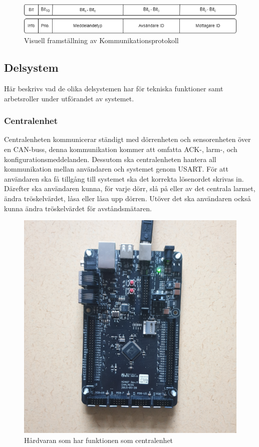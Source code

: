 \documentclass{article}
\begin{document}
\begin{figure}[h]
    \centering
    \includegraphics[scale=0.5]{Projektrapport/protokoll.png}
    \caption {Visuell framställning av Kommunikationsprotokoll}
    \label{fig:drawing}
\end{figure}


\subsection{Delsystem}
Här beskrivs vad de olika delsystemen har för tekniska funktioner samt arbetsroller under utförandet av systemet. 

\subsubsection{Centralenhet}
Centralenheten kommunicerar ständigt med dörrenheten och sensorenheten över en CAN-buss, denna kommunikation kommer att omfatta ACK-, larm-, och konfigurationsmeddelanden. 
Dessutom ska centralenheten hantera all kommunikation mellan användaren och systemet genom USART. För att användaren ska få tillgång till systemet ska det korrekta lösenordet skrivas in. 
Därefter ska användaren kunna, för varje dörr, slå på eller av det centrala larmet, ändra tröskelvärdet, låsa eller låsa upp dörren. 
Utöver det ska användaren också kunna ändra tröskelvärdet för avståndsmätaren.

\begin{figure}[h]
    \centering
    \includegraphics[scale=0.05]{Projektrapport/central.png}
    \caption {Hårdvaran som har funktionen som centralenhet}
    \label{fig:drawing}
\end{figure}
\end{document}
